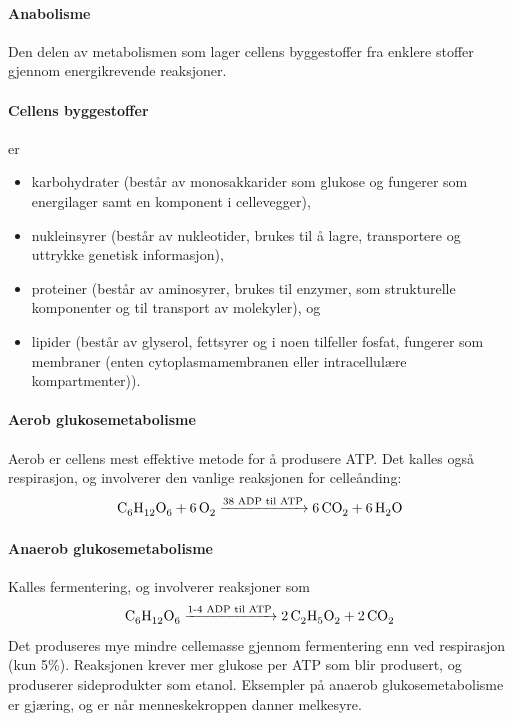 \paragraph{Anabolisme} Den delen av metabolismen som lager cellens byggestoffer fra enklere stoffer gjennom energikrevende reaksjoner.

\paragraph{Cellens byggestoffer} er 
\begin{itemize}[nolistsep,noitemsep]
	\item karbohydrater (består av monosakkarider som glukose og fungerer som energilager samt en komponent i cellevegger),
	\item nukleinsyrer (består av nukleotider, brukes til å lagre, transportere og uttrykke genetisk informasjon),
	\item proteiner (består av aminosyrer, brukes til enzymer, som strukturelle komponenter og til transport av molekyler), og
	\item lipider (består av glyserol, fettsyrer og i noen tilfeller fosfat, fungerer som membraner (enten cytoplasmamembranen eller intracellulære kompartmenter)).
\end{itemize}

\paragraph{Aerob glukosemetabolisme} Aerob  er cellens mest effektive metode for å produsere ATP. Det kalles også respirasjon, og involverer den vanlige reaksjonen for celleånding:
\begin{equation*}
	\ce{C6H12O6 + 6O2 ->[\text{38 ADP til ATP}] 6CO2 + 6H2O}
\end{equation*}

\paragraph{Anaerob glukosemetabolisme} Kalles fermentering, og involverer reaksjoner som 
\begin{equation*}
	\ce{C6H12O6 ->[\text{1-4 ADP til ATP}] 2C2H5O2 + 2CO2}
\end{equation*}
Det produseres mye mindre cellemasse gjennom fermentering enn ved respirasjon (kun 5\%). Reaksjonen krever mer glukose per ATP som blir produsert, og produserer sideprodukter som etanol. Eksempler på anaerob glukosemetabolisme er gjæring, og er når menneskekroppen danner melkesyre.

